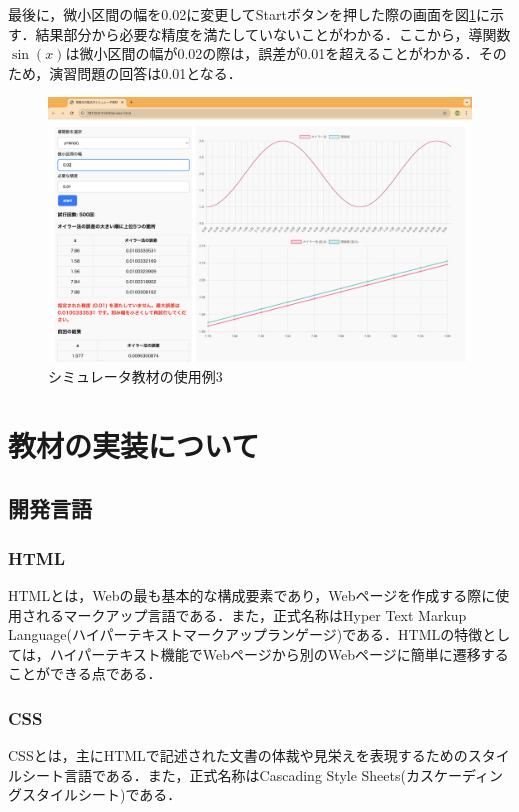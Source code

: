 \documentclass[a4paper, 12pt]{ltjsarticle}
\begin{document}
\clearpage

最後に，微小区間の幅を0.02に変更してStartボタンを押した際の画面を図\ref{fig:シミュレータ教材の使用例3}に示す．結果部分から必要な精度を満たしていないことがわかる．ここから，導関数$\sin(x)$は微小区間の幅が0.02の際は，誤差が0.01を超えることがわかる．そのため，演習問題の回答は0.01となる．

\begin{figure}[h]
\begin{center}
\includegraphics[clip,width=\textwidth,keepaspectratio]{sim-sample4.png}
\end{center}
\caption{シミュレータ教材の使用例3}
\label{fig:シミュレータ教材の使用例3}
\end{figure}
\clearpage
\section{教材の実装について}
\subsection{開発言語}
\subsubsection{HTML}
HTMLとは，Webの最も基本的な構成要素であり，Webページを作成する際に使用されるマークアップ言語である．また，正式名称はHyper Text Markup Language(ハイパーテキストマークアップランゲージ)である．HTMLの特徴としては，ハイパーテキスト機能でWebページから別のWebページに簡単に遷移することができる点である．
\subsubsection{CSS}
CSSとは，主にHTMLで記述された文書の体裁や見栄えを表現するためのスタイルシート言語である．また，正式名称はCascading Style Sheets(カスケーディングスタイルシート)である．
\end{document}
